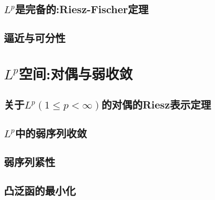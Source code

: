 \documentclass[lang=cn,newtx,10pt,scheme=chinese]{elegantbook}
\begin{document}
\section{$L^p$是完备的:Riesz-Fischer定理}

\section{逼近与可分性}





\chapter{$L^p$空间:对偶与弱收敛}

\section{关于$L^p(1\leqslant p<\infty)$的对偶的Riesz表示定理}

\section{$L^p$中的弱序列收敛}

\section{弱序列紧性}

\section{凸泛函的最小化}
\end{document}
